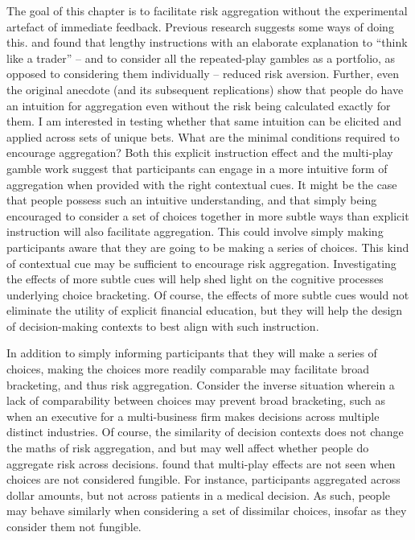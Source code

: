 \documentclass[a4paper, nobind, dvipsnames]{templates/ociamthesis}
\theoremstyle{definition}
\theoremstyle{definition}
\theoremstyle{definition}
\theoremstyle{definition}
\theoremstyle{remark}
\begin{document}
The goal of this chapter is to facilitate risk aggregation without the
experimental artefact of immediate feedback. Previous research suggests some
ways of doing this. \textcite{sokolhessner2009} and \textcite{sokolhessner2012} found that lengthy
instructions with an elaborate explanation to ``think like a trader'' -- and to
consider all the repeated-play gambles as a portfolio, as opposed to considering
them individually -- reduced risk aversion. Further, even the original
\textcite{samuelson1963} anecdote (and its subsequent replications) show that people do
have an intuition for aggregation even without the risk being calculated exactly
for them. I am interested in testing whether that same intuition can be elicited
and applied across sets of unique bets. What are the minimal conditions required
to encourage aggregation? Both this explicit instruction effect and the
multi-play gamble work suggest that participants can engage in a more intuitive
form of aggregation when provided with the right contextual cues. It might be
the case that people possess such an intuitive understanding, and that simply
being encouraged to consider a set of choices together in more subtle ways than
explicit instruction will also facilitate aggregation. This could involve simply
making participants aware that they are going to be making a series of choices.
This kind of contextual cue may be sufficient to encourage risk aggregation.
Investigating the effects of more subtle cues will help shed light on the
cognitive processes underlying choice bracketing. Of course, the effects of more
subtle cues would not eliminate the utility of explicit financial education, but
they will help the design of decision-making contexts to best align with such
instruction.

In addition to simply informing participants that they will make a series of
choices, making the choices more readily comparable may facilitate broad
bracketing, and thus risk aggregation. Consider the inverse situation wherein a
lack of comparability between choices may prevent broad bracketing, such as when
an executive for a multi-business firm makes decisions across multiple distinct
industries. Of course, the similarity of decision contexts does not change the
maths of risk aggregation, and but may well affect whether people do aggregate
risk across decisions. \textcite{dekay2005} found that multi-play effects are not seen
when choices are not considered fungible. For instance, participants aggregated
across dollar amounts, but not across patients in a medical decision. As such,
people may behave similarly when considering a set of dissimilar choices,
insofar as they consider them not fungible.
\end{document}
